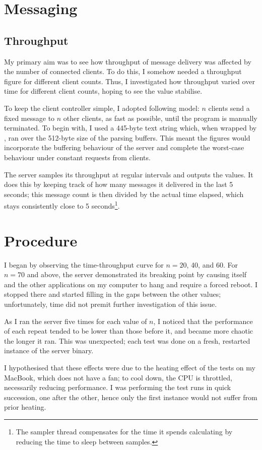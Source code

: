 \documentclass[12pt,a4paper,twoside,openright]{report}
\begin{document}
{\section{Messaging}
\subsection{Throughput}
My primary aim was to see how throughput of message delivery was affected by the number of connected clients. To do this, I somehow needed a throughput figure for different client counts. Thus, I investigated how throughput varied over time for different client counts, hoping to see the value stabilise.

To keep the client controller simple, I adopted following model: $n$ clients send a fixed message to $n$ other clients, as fast as possible, until the program is manually terminated. To begin with, I used a 445-byte text string which, when wrapped by , ran over the 512-byte size of the parsing buffers. This meant the figures would incorporate the buffering behaviour of the server and complete the worst-case behaviour under constant requests from clients.

The server samples its throughput at regular intervals and outputs the values. It does this by keeping track of how many messages it delivered in the last 5 seconds; this message count is then divided by the actual time elapsed, which stays consistently close to 5 seconds\footnote{The sampler thread compensates for the time it spends calculating by reducing the time to sleep between samples. }.

\section{Procedure}
I began by observing the time-throughput curve for $n=20$, 40, and 60. For $n=70$ and above, the server demonstrated its breaking point by causing itself and the other applications on my computer to hang and require a forced reboot. I stopped there and started filling in the gaps between the other values; unfortunately, time did not premit further investigation of this issue.

As I ran the server five times for each value of $n$, I noticed that the performance of each repeat tended to be lower than those before it, and became more chaotic the longer it ran. This was unexpected; each test was done on a fresh, restarted instance of the server binary.

I hypothesised that these effects were due to the heating effect of the tests on my MacBook, which does not have a fan; to cool down, the CPU is throttled, necessarily reducing performance. I was performing the test runs in quick succession, one after the other, hence only the first instance would not suffer from prior heating.

}
\end{document}
